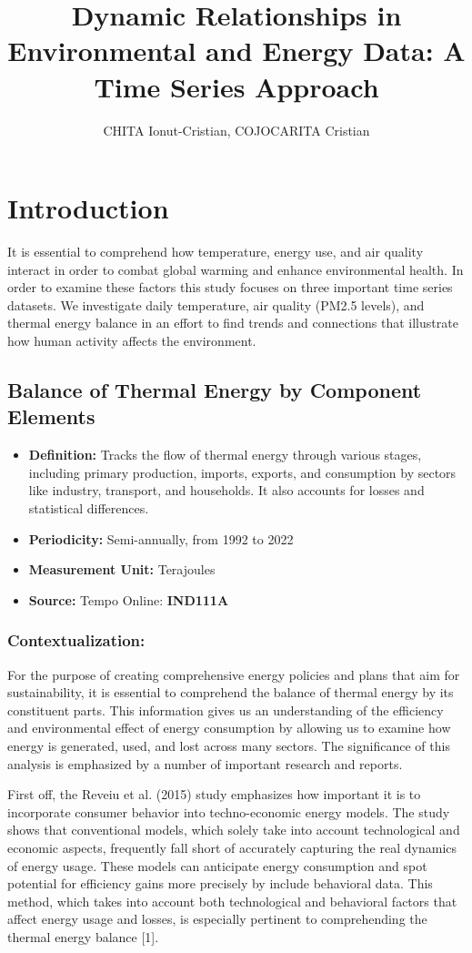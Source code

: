 \documentclass{article} %
\title{Dynamic Relationships in Environmental and Energy Data: A Time Series Approach}
\author{CHITA Ionut-Cristian, COJOCARITA Cristian}
\date{}
\begin{document}
\maketitle
\tableofcontents

\section{Introduction}
It is essential to comprehend how temperature, energy use, and air quality interact in order to combat global warming and enhance environmental health. In order to examine these factors this study focuses on three important time series datasets. We investigate daily temperature, air quality (PM2.5 levels), and thermal energy balance in an effort to find trends and connections that illustrate how human activity affects the environment.

\subsection{Balance of Thermal Energy by Component Elements}
\begin{itemize}
    \item \textbf{Definition:} Tracks the flow of thermal energy through various stages, including primary production, imports, exports, and consumption by sectors like industry, transport, and households. It also accounts for losses and statistical differences.
    \item \textbf{Periodicity:} Semi-annually, from 1992 to 2022
    \item \textbf{Measurement Unit:} Terajoules
    \item \textbf{Source:} Tempo Online: \textbf{IND111A}
\end{itemize}

\subsubsection*{Contextualization:}
For the purpose of creating comprehensive energy policies and plans that aim for sustainability, it is essential to comprehend the balance of thermal energy by its constituent parts. This information gives us an understanding of the efficiency and environmental effect of energy consumption by allowing us to examine how energy is generated, used, and lost across many sectors. The significance of this analysis is emphasized by a number of important research and reports.

First off, the Reveiu et al. (2015) study emphasizes how important it is to incorporate consumer behavior into techno-economic energy models. The study shows that conventional models, which solely take into account technological and economic aspects, frequently fall short of accurately capturing the real dynamics of energy usage. These models can anticipate energy consumption and spot potential for efficiency gains more precisely by include behavioral data. This method, which takes into account both technological and behavioral factors that affect energy usage and losses, is especially pertinent to comprehending the thermal energy balance [1].
\end{document}
